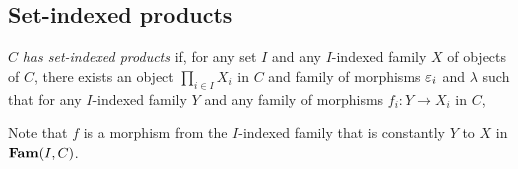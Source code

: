 \subsection{Set-indexed products}

$C$ \emph{has set-indexed products} if, for any set $I$ and any $I$-indexed family $X$ of objects of $C$,
there exists an object $\prod_{i \in I}X_i$ in $C$ and family of morphisms $\varepsilon_i$ and $\lambda$ such that
for any $I$-indexed family $Y$ and any family of morphisms $f_i: Y \to X_i$ in $C$,

\begin{center}
\end{center}

Note that $f$ is a morphism from the $I$-indexed family that is constantly $Y$ to $X$ in $\mathbf{Fam}(I,C)$.
